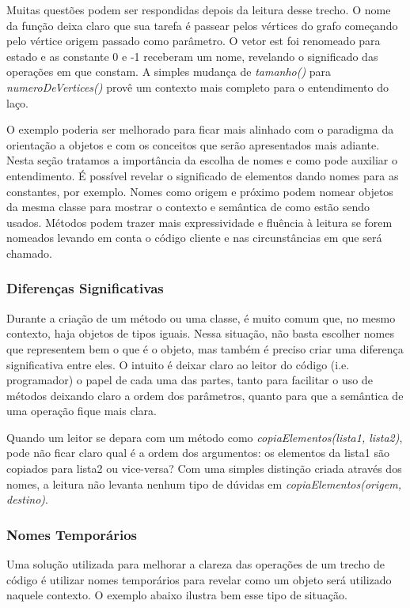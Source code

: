 Muitas questões podem ser respondidas depois da leitura desse trecho. O nome da função deixa claro que sua tarefa é passear pelos vértices do grafo começando pelo vértice origem passado como parâmetro. O vetor est foi renomeado para estado e as constante 0 e -1 receberam um nome, revelando o significado das operações em que constam. A simples mudança de \textit{tamanho()} para \textit{numeroDeVertices()} provê um contexto mais completo para o entendimento do laço.
	
O exemplo poderia ser melhorado para ficar mais alinhado com o paradigma da orientação a objetos e com os conceitos que serão apresentados mais adiante. Nesta seção tratamos a importância da escolha de nomes e como pode auxiliar o entendimento. É possível revelar o significado de elementos dando nomes para as constantes, por exemplo. Nomes como origem e próximo podem nomear objetos da mesma classe para mostrar o contexto e semântica de como estão sendo usados. Métodos podem trazer mais expressividade e fluência à leitura se forem nomeados levando em conta o código cliente e nas circunstâncias em que será chamado.

\subsubsection{Diferenças Significativas}
Durante a criação de um método ou uma classe, é muito comum que, no mesmo contexto, haja  objetos de tipos iguais. Nessa situação, não basta escolher nomes que representem bem o que é o objeto, mas também é preciso criar uma diferença significativa entre eles. O intuito é deixar claro ao leitor do código  (i.e. programador) o papel de cada uma das partes, tanto para facilitar o uso de métodos deixando claro a ordem dos parâmetros, quanto para que a semântica de uma operação fique mais clara.
	
Quando um leitor se depara com um método como \textit{copiaElementos(lista1, lista2)}, pode não ficar claro qual é a ordem dos argumentos: os elementos da lista1 são copiados para lista2 ou vice-versa? Com uma simples distinção criada através dos nomes, a leitura não levanta nenhum tipo de dúvidas em \textit{copiaElementos(origem, destino)}.

\subsubsection{Nomes Temporários}
Uma solução utilizada para melhorar a clareza das operações de um trecho de código é utilizar nomes temporários para revelar como um objeto será utilizado naquele contexto. O exemplo abaixo ilustra bem esse tipo de situação.

